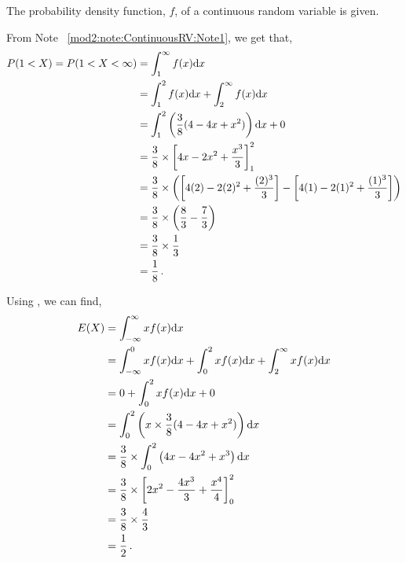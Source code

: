 \begin{subquestions}
\begin{subsubquestions}
\end{subsubquestions}


\subquestion

The probability density function, $f$, of a continuous random variable is given.

\begin{subsubquestions}
	
\subsubquestion

From Note ~\ref{mod2:note:ContinuousRV:Note1}, we get that,
\begin{align}
	P(1<X) = P(1<X<\infty) & = \int_{1}^{\infty}f(x)\mathrm{d}x \nonumber \\
	                       & = \int_{1}^{2}f(x)\mathrm{d}x+\int_{2}^{\infty}f(x)\mathrm{d}x \nonumber \\
							& = \int_1^2 \left(\frac{3}{8}(4-4x+x^2) \right)\mathrm{d}x + 0\nonumber \\
	                  & = \frac{3}{8} \times \left[4x-2x^2+\frac{x^3}{3} \right]_1^2 \nonumber \\
	                  & = \frac{3}{8} \times \left(\left[4(2)-2(2)^2+\frac{(2)^3}{3} \right]-\left[4(1)-2(1)^2+\frac{(1)^3}{3} \right] \right) \nonumber \\
	                  & = \frac{3}{8} \times \left( \frac{8}{3} - \frac{7}{3}\right) \nonumber \\
	                  & = \frac{3}{8} \times \frac{1}{3} \nonumber \\
	                  & = \frac{1}{8} \,.	
\end{align}


Using , we can find,
\begin{align}
	E(X) & = \int_{-\infty}^{\infty}x f(x)\mathrm{d}x \nonumber \\
	     & = \int_{-\infty}^{0}x f(x)\mathrm{d}x + \int_{0}^{2}x f(x)\mathrm{d}x + \int_{2}^{\infty}x f(x)\mathrm{d}x \nonumber \\
	     & = 0 + \int_{0}^{2}x f(x)\mathrm{d}x + 0 \nonumber \\
	     & = \int_{0}^{2} \left(x \times \frac{3}{8}(4-4x+x^2)\right)\mathrm{d}x \nonumber \\
	     & = \frac{3}{8} \times \int_{0}^{2} \left(4x-4x^2+x^3\right)\mathrm{d}x \nonumber \\
	     & = \frac{3}{8} \times \left[ 2x^2 - \frac{4x^3}{3} + \frac{x^4}{4}\right]_0^2 \nonumber \\
	     & = \frac{3}{8} \times \frac{4}{3} \nonumber \\
	     & = \frac{1}{2} \,. \\
\end{align}


\end{subsubquestions}
\end{subquestions}
